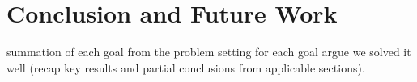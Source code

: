 \section{Conclusion and Future Work}\label{sec:future}



summation of each goal from the problem setting for each goal argue we solved it well (recap key results and partial conclusions from applicable sections).






% 
% 
% 
% 

